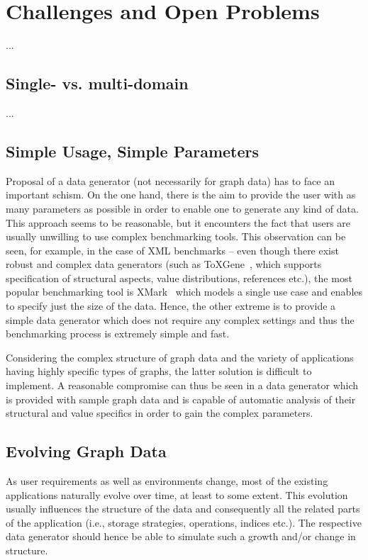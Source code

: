 \section{Challenges and Open Problems}
\label{sec:challenges}

...

\subsection{Single- vs. multi-domain}
...

\subsection{Simple Usage, Simple Parameters}
Proposal of a data generator (not necessarily for graph data) has to face an important schism. On the one hand, there is the aim to provide the user with as many parameters as possible in order to enable one to generate any kind of data. This approach seems to be reasonable, but it encounters the fact that users are usually unwilling to use complex benchmarking tools. This observation can be seen, for example, in the case of XML benchmarks -- even though there exist robust and complex data generators (such as ToXGene~\cite{conf/webdb/BarbosaMKL02}, which supports specification of structural aspects, value distributions, references etc.), the most popular benchmarking tool is XMark~\cite{Schmidt:2002:XBX:1287369.1287455} which models a single use case and enables to specify just the size of the data. Hence, the other extreme is to provide a simple data generator which does not require any complex settings and thus the benchmarking process is extremely simple and fast.

Considering the complex structure of graph data and the variety of applications having highly specific types of graphs, the latter solution is difficult to implement. A reasonable compromise can thus be seen in a data generator which is provided with sample graph data and is capable of automatic analysis of their structural and value specifics in order to gain the complex parameters.

\subsection{Evolving Graph Data}
As user requirements as well as environments change, most of the existing applications naturally evolve over time, at least to some extent. This evolution usually influences the structure of the data and consequently all the related parts of the application (i.e., storage strategies, operations, indices etc.). The respective data generator should hence be able to simulate such a growth and/or change in structure.

